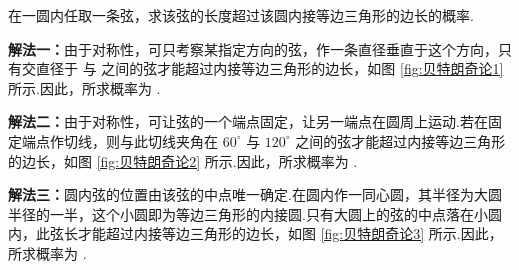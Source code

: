 \begin{example}[][贝特朗奇论]
    \indent 在一圆内任取一条弦，求该弦的长度超过该圆内接等边三角形的边长的概率.
\end{example}

\begin{solution}

    \textbf{解法一：}由于对称性，可只考察某指定方向的弦，作一条直径垂直于这个方向，只有交直径于  与  之间的弦才能超过内接等边三角形的边长，如图 \ref{fig:贝特朗奇论1} 所示.因此，所求概率为 .

    \textbf{解法二：}由于对称性，可让弦的一个端点固定，让另一端点在圆周上运动.若在固定端点作切线，则与此切线夹角在 $60^{\circ}$ 与 $120^{\circ}$ 之间的弦才能超过内接等边三角形的边长，如图 \ref{fig:贝特朗奇论2} 所示.因此，所求概率为 .

    \textbf{解法三：}圆内弦的位置由该弦的中点唯一确定.在圆内作一同心圆，其半径为大圆半径的一半，这个小圆即为等边三角形的内接圆.只有大圆上的弦的中点落在小圆内，此弦长才能超过内接等边三角形的边长，如图 \ref{fig:贝特朗奇论3} 所示.因此，所求概率为 .

    \begin{figure}[H]
        \centering

\end{figure}
\end{solution}
